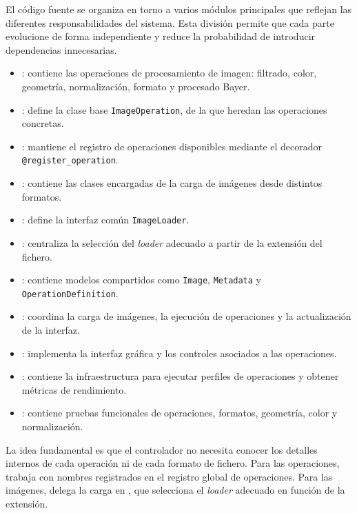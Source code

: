 El código fuente se organiza en torno a varios módulos principales que reflejan las
diferentes responsabilidades del sistema. Esta división permite que cada parte evolucione 
de forma independiente y reduce la probabilidad de introducir dependencias innecesarias.

\begin{itemize}[noitemsep]
    \item {}: contiene las operaciones de procesamiento de imagen: filtrado, color, geometría, normalización, formato y procesado Bayer.
    \item {}: define la clase base \texttt{ImageOperation}, de la que heredan las operaciones concretas.
    \item {}: mantiene el registro de operaciones disponibles mediante el decorador \\ \texttt{@register\_operation}.
    \item {}: contiene las clases encargadas de la carga de imágenes desde distintos formatos.
    \item {}: define la interfaz común \texttt{ImageLoader}.
    \item {}: centraliza la selección del \textit{loader} adecuado a partir de la extensión del fichero.
    \item {}: contiene modelos compartidos como \texttt{Image}, \texttt{Metadata} y \texttt{OperationDefinition}.
    \item {}: coordina la carga de imágenes, la ejecución de operaciones y la actualización de la interfaz.
    \item {}: implementa la interfaz gráfica y los controles asociados a las operaciones.
    \item {}: contiene la infraestructura para ejecutar perfiles de operaciones y obtener métricas de rendimiento.
    \item {}: contiene pruebas funcionales de operaciones, formatos, geometría, color y normalización.
\end{itemize}

La idea fundamental es que el controlador no necesita conocer los detalles
internos de cada operación ni de cada formato de fichero. Para las operaciones,
trabaja con nombres registrados en el registro global de operaciones. Para las imágenes,
delega la carga en , que selecciona el \textit{loader}
adecuado en función de la extensión.

